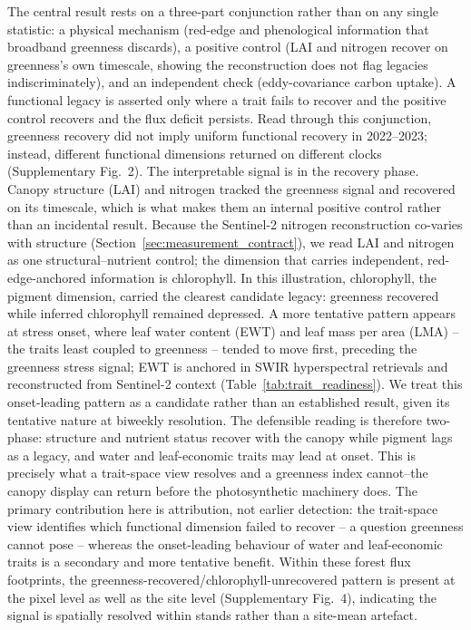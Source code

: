 \documentclass[pdflatex,sn-mathphys-num]{sn-jnl}
\begin{document}
The central result rests on a three-part conjunction rather than on any single statistic: a physical mechanism (red-edge and phenological information that broadband greenness discards), a positive control (LAI and nitrogen recover on greenness's own timescale, showing the reconstruction does not flag legacies indiscriminately), and an independent check (eddy-covariance carbon uptake). A functional legacy is asserted only where a trait fails to recover and the positive control recovers and the flux deficit persists. Read through this conjunction, greenness recovery did not imply uniform functional recovery in 2022--2023; instead, different functional dimensions returned on different clocks (Supplementary Fig.~2). The interpretable signal is in the recovery phase. Canopy structure (LAI) and nitrogen tracked the greenness signal and recovered on its timescale, which is what makes them an internal positive control rather than an incidental result. Because the Sentinel-2 nitrogen reconstruction co-varies with structure (Section~\ref{sec:measurement_contract}), we read LAI and nitrogen as one structural--nutrient control; the dimension that carries independent, red-edge-anchored information is chlorophyll. In this illustration, chlorophyll, the pigment dimension, carried the clearest candidate legacy: greenness recovered while inferred chlorophyll remained depressed. A more tentative pattern appears at stress onset, where leaf water content (EWT) and leaf mass per area (LMA) -- the traits least coupled to greenness -- tended to move first, preceding the greenness stress signal; EWT is anchored in SWIR hyperspectral retrievals and reconstructed from Sentinel-2 context (Table~\ref{tab:trait_readiness}). We treat this onset-leading pattern as a candidate rather than an established result, given its tentative nature at biweekly resolution. The defensible reading is therefore two-phase: structure and nutrient status recover with the canopy while pigment lags as a legacy, and water and leaf-economic traits may lead at onset. This is precisely what a trait-space view resolves and a greenness index cannot--the canopy display can return before the photosynthetic machinery does. The primary contribution here is attribution, not earlier detection: the trait-space view identifies which functional dimension failed to recover -- a question greenness cannot pose -- whereas the onset-leading behaviour of water and leaf-economic traits is a secondary and more tentative benefit. Within these forest flux footprints, the greenness-recovered/chlorophyll-unrecovered pattern is present at the pixel level as well as the site level (Supplementary Fig.~4), indicating the signal is spatially resolved within stands rather than a site-mean artefact.
\end{document}
